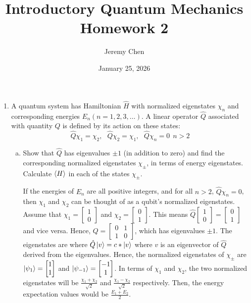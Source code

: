 \documentclass[10pt,letterpaper]{article}
\title{Introductory Quantum Mechanics Homework 2}
\author{Jeremy Chen}
\date{January 25, 2026}
\begin{document}
	\maketitle

\begin{enumerate}
\item A quantum system has Hamiltonian $\hat{H}$ with normalized eigenstates $\chi_{n}$ and corresponding energies $E_{n}(n = 1, 2, 3, \dots)$. A linear operator $\hat{Q}$ associated with quantity $Q$ is defined by its action on these states:
$$\hat{Q}\chi_{1} = \chi_{2},\ \ \ \hat{Q}\chi_{2} = \chi_{1},\ \ \ \hat{Q}\chi_{n} = 0\ \ n > 2$$

\begin{enumerate}[(a)]
\item Show that $\hat{Q}$ has eigenvalues $\pm 1$  (in addition to zero) and find the corresponding normalized eigenstates $\chi_{\pm}$, in terms of energy eigenstates. Calculate $\braket{H}$ in each of the states $\chi_{\pm}$. 

\color{violet}

If the energies of $E_{n}$ are all positive integers, and for all $n > 2$, $\hat{Q}\chi_{n} = 0$, then $\chi_{1}$ and $\chi_{2}$ can be thought of as a qubit's normalized eigenstates. Assume that $\chi_{1} = \begin{bmatrix}
1 \\
0
\end{bmatrix}$ and $\chi_{2} = \begin{bmatrix}
0 \\
1
\end{bmatrix}$. This means $\hat{Q}\begin{bmatrix}
1 \\
0
\end{bmatrix} = \begin{bmatrix}
0 \\
1
\end{bmatrix}$ and vice versa. Hence, $\hat{Q} = \begin{bmatrix}
0 & 1 \\
1 & 0
\end{bmatrix}$, which has eigenvalues $\pm 1$. The eigenstates are where $\hat{Q}\ket{v} = c * \ket{v}$ where $v$ is an eigenvector of $\hat{Q}$ derived from the eigenvalues. Hence, the normalized eigenstates of $\chi_{\pm}$ are $\ket{\psi_{1}} = \begin{bmatrix}
1 \\
1
\end{bmatrix}$ and $\ket{\psi_{-1}} = \begin{bmatrix}
-1 \\
1
\end{bmatrix}$. In terms of $\chi_{1}$ and $\chi_{2}$, the two normalized eigenstates will be $\frac{\chi_{1} + \chi_{2}}{\sqrt{2}}$ and $\frac{\chi_{1} - \chi_{2}}{\sqrt{2}}$ respectively. Then, the energy expectation values would be $\frac{E_{1} + E_{2}}{2}$. 
\color{black}


\end{enumerate}
\end{enumerate}
\end{document}
